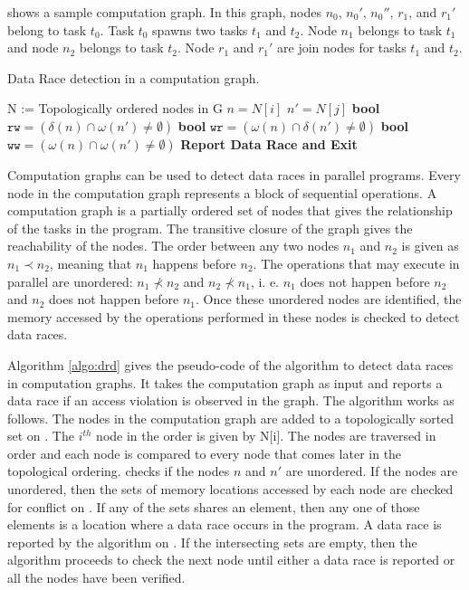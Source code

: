  shows a sample computation graph. In this graph, nodes $n_0$, $n_0'$, $n_0''$, $r_1$, and $r_1'$ belong to task $t_0$. Task $t_0$ spawns two tasks $t_1$ and $t_2$. Node $n_1$ belongs to task $t_1$ and node $n_2$ belongs to task $t_2$. Node $r_1$ and $r_1'$ are join nodes for tasks $t_1$ and $t_2$. 

\begin{algorithm}
\caption{Data Race detection in a computation graph.} \label{algo:drd}
\begin{algorithmic}[1]
\label{loc:topo}
\State N := Topologically ordered nodes in G
\State $n = N[i]$
\State $n' = N[j]$
  \label{loc:path} \label{loc:forall}
	\State \textbf{bool} $\mathtt{rw} = (\delta(n) \cap \omega(n') \neq \emptyset) $
	\State \textbf{bool} $\mathtt{wr} = (\omega(n) \cap \delta(n') \neq \emptyset) $
	\State \textbf{bool} $\mathtt{ww} = (\omega(n) \cap \omega(n') \neq \emptyset)$
		 \label{loc:intersection}
			\State \textbf{Report Data Race and Exit} \label{loc:datarace}
		\EndIf
\EndIf
 \EndFor
 \EndFor
\EndFunction  
\end{algorithmic}
\end{algorithm}

Computation graphs can be used to detect data races in parallel programs. Every node in the computation graph represents a block of sequential operations. A computation graph is a partially ordered set of nodes that gives the relationship of the tasks in the program. The transitive closure of the graph gives the reachability of the nodes. The order between any two nodes $n_1$ and $n_2$ is given as $n_1 \prec n_2$, meaning that $n_1$ happens before $n_2$. The operations that may execute in parallel are unordered: $n_1 \nprec n_2$ and $n_2 \nprec n_1$, i. e. $n_1$ does not happen before $n_2$ and $n_2$ does not happen before $n_1$. Once these unordered nodes are identified, the memory accessed by the operations performed in these nodes is checked to detect data races. 

Algorithm \ref{algo:drd} gives the pseudo-code of the algorithm to detect data races in computation graphs. It takes the computation graph as input and reports a data race if an access violation is observed in the graph. The algorithm works as follows. The nodes in the computation graph are added to a topologically sorted set on . The $i^{th}$ node in the order is given by N[i]. The nodes are traversed in order and each node is compared to every node that comes later in the topological ordering.  checks if the nodes $n$ and $n'$ are  unordered. If the nodes are unordered, then the sets of memory locations accessed by each node are checked for conflict on . If any of the sets shares an element, then any one of those elements is a location where a data race occurs in the program. A data race is reported by the algorithm on . If the intersecting sets are empty, then the algorithm proceeds to check the next node until either a data race is reported or all the nodes have been verified.

